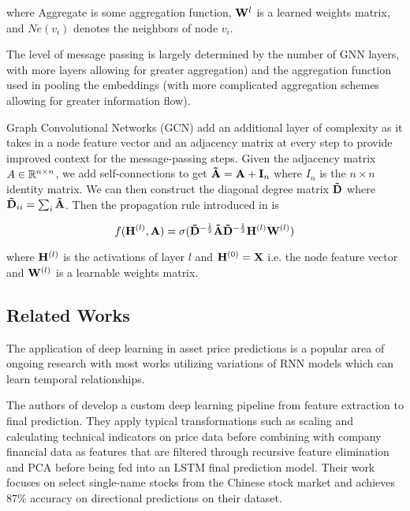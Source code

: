 where Aggregate is some aggregation function, $\mVector{W}^{l}$ is a learned weights matrix, and $Ne(v_i)$ denotes the neighbors of node $v_i$.

The level of message passing is largely determined by the number of GNN layers, with more layers allowing for greater aggregation) and the aggregation function used in pooling the embeddings (with more complicated aggregation schemes allowing for greater information flow).

Graph Convolutional Networks (GCN) add an additional layer of complexity as it takes in a node feature vector and an adjacency matrix at every step to provide improved context for the message-passing steps. Given the adjacency matrix $A \in \mathbb{R}^{n \times n}$, we add self-connections to get $\mVector{\tilde{A}} = \mVector{A} + \mVector{I}_n$ where $I_n$ is the $n \times n$ identity matrix. We can then construct the diagonal degree matrix $\mVector{\tilde{D}}$ where $\mVector{\tilde{D}}_{ii} = \sum_i\mVector{\tilde{A}}$. Then the propagation rule introduced in \cite{Kipf2017} is

\begin{equation}
f(\mVector{H}^{(l)}, \mVector{A}) = \sigma(\mVector{\tilde{D}}^{-\frac{1}{2}}\mVector{\tilde{A}}\mVector{\tilde{D}}^{-\frac{1}{2}}\mVector{H}^{(l)}\mVector{W}^{(l)})
\end{equation}

where $\mVector{H}^{(l)}$ is the activations of layer $l$ and $\mVector{H}^{(0)} = \mVector{X}$ i.e. the node feature vector and $\mVector{W}^{(l)}$ is a learnable weights matrix.

\subsection{Related Works} \label{Related Works}

The application of deep learning in asset price predictions is a popular area of ongoing research with most works utilizing variations of RNN models which can learn temporal relationships.

The authors of \cite{Shen2020} develop a custom deep learning pipeline from feature extraction to final prediction. They apply typical transformations such as scaling and calculating technical indicators on price data before combining with company financial data as features that are filtered through recursive feature elimination and PCA before being fed into an LSTM final prediction model. Their work focuses on select single-name stocks from the Chinese stock market and achieves 87\% accuracy on directional predictions on their dataset.

